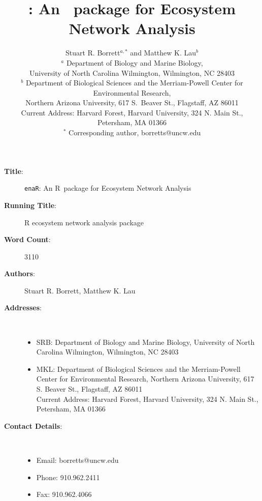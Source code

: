 \documentclass[11pt]{article}
\title{\enaR: An \R\ package for Ecosystem Network Analysis}
\author{Stuart R. Borrett$^{a,*}$ and Matthew K. Lau$^b$
  \\ {\footnotesize $^a$ Department of Biology and Marine Biology,} \\
    {\footnotesize University of North Carolina Wilmington, Wilmington, NC 28403}
  \\ {\footnotesize $^b$ Department of Biological Sciences and the
    Merriam-Powell Center for Environmental Research,} \\
{\footnotesize Northern Arizona University, 617 S.\ Beaver St.,
  Flagstaff, AZ 86011}\\
{\footnotesize Current Address: Harvard Forest, Harvard University, 324
      N. Main St., Petersham, MA 01366}
  \\ {\footnotesize $^*$ Corresponding author, borretts@uncw.edu} }
\newcommand{\R}{R}
\newcommand{\enaR}{\texttt{enaR}}
\begin{document}

\begin{description}
  \item[\textbf{Title}:] \enaR: An \R\ package for Ecosystem Network Analysis
  \item[\textbf{Running Title}:] R ecosystem network analysis package
  \item[\textbf{Word Count}:] 3110
  \item[\textbf{Authors}:] Stuart R. Borrett, Matthew K. Lau
  \item[\textbf{Addresses}:] \
    \begin{itemize}
    \item SRB: Department of Biology and Marine Biology, University of
      North Carolina Wilmington, Wilmington, NC 28403
    \item MKL: Department of Biological Sciences and the
      Merriam-Powell Center for Environmental Research, Northern
      Arizona University, 617 S. Beaver St., Flagstaff, AZ 86011
      \\ Current Address: Harvard Forest, Harvard University, 324
      N. Main St., Petersham, MA 01366
    \end{itemize}
  \item[\textbf{Contact Details}:] \
    \begin{itemize}
    \item Email: borretts@uncw.edu
    \item Phone: 910.962.2411
    \item Fax: 910.962.4066
    \end{itemize}
\end{description}

\pagebreak

\maketitle
\end{document}
